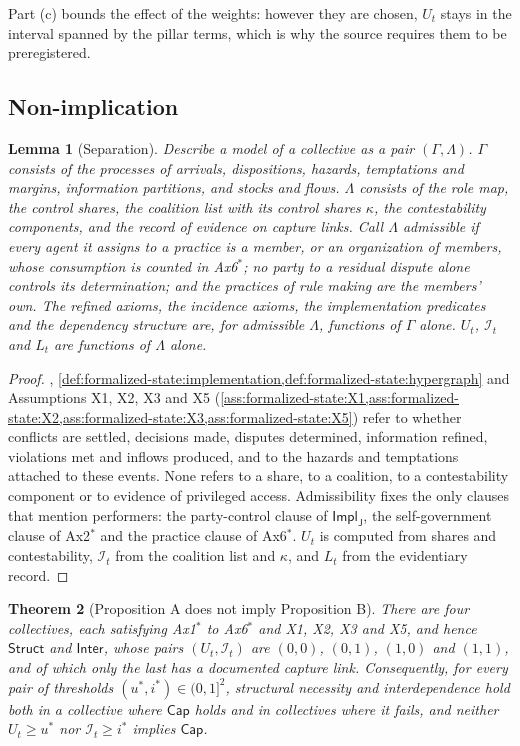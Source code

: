 \documentclass[11pt,letterpaper]{article}
\newtheorem{theorem}{Theorem}[section]
\newtheorem{lemma}[theorem]{Lemma}
\theoremstyle{definition}
\theoremstyle{remark}
\newcommand{\pJ}{\mathsf{J}}
\newcommand{\Integ}{\mathcal{I}}
\newcommand{\Struct}{\mathsf{Struct}}
\newcommand{\Inter}{\mathsf{Inter}}
\newcommand{\Capt}{\mathsf{Cap}}
\newcommand{\Impl}{\mathsf{Impl}}
\begin{document}
Part (c) bounds the effect of the weights: however they are chosen, $U_t$ stays in the interval spanned by the pillar terms, which is why the source requires them to be preregistered.

\subsection{Non-implication}

\begin{lemma}[Separation]
\label{lem:formalized-state:separation}
Describe a model of a collective as a pair $(\Gamma,\Lambda)$. $\Gamma$ consists of the processes of arrivals, dispositions, hazards, temptations and margins, information partitions, and stocks and flows. $\Lambda$ consists of the role map, the control shares, the coalition list with its control shares $\kappa$, the contestability components, and the record of evidence on capture links. Call $\Lambda$ admissible if every agent it assigns to a practice is a member, or an organization of members, whose consumption is counted in Ax6$^{*}$; no party to a residual dispute alone controls its determination; and the practices of rule making are the members' own. The refined axioms, the incidence axioms, the implementation predicates and the dependency structure are, for admissible $\Lambda$, functions of $\Gamma$ alone. $U_t$, $\Integ_t$ and $L_t$ are functions of $\Lambda$ alone.
\end{lemma}

\begin{proof}
, \cref{def:formalized-state:implementation,def:formalized-state:hypergraph} and Assumptions X1, X2, X3 and X5 (\cref{ass:formalized-state:X1,ass:formalized-state:X2,ass:formalized-state:X3,ass:formalized-state:X5}) refer to whether conflicts are settled, decisions made, disputes determined, information refined, violations met and inflows produced, and to the hazards and temptations attached to these events. None refers to a share, to a coalition, to a contestability component or to evidence of privileged access. Admissibility fixes the only clauses that mention performers: the party-control clause of $\Impl_{\pJ}$, the self-government clause of Ax2$^{*}$ and the practice clause of Ax6$^{*}$. $U_t$ is computed from shares and contestability, $\Integ_t$ from the coalition list and $\kappa$, and $L_t$ from the evidentiary record.
\end{proof}

\begin{theorem}[Proposition A does not imply Proposition B]
\label{thm:formalized-state:nonimplication}
There are four collectives, each satisfying Ax1$^{*}$ to Ax6$^{*}$ and X1, X2, X3 and X5, and hence $\Struct$ and $\Inter$, whose pairs $(U_t,\Integ_t)$ are $(0,0)$, $(0,1)$, $(1,0)$ and $(1,1)$, and of which only the last has a documented capture link. Consequently, for every pair of thresholds $(u^{*},i^{*})\in(0,1]^2$, structural necessity and interdependence hold both in a collective where $\Capt$ holds and in collectives where it fails, and neither $U_t\ge u^{*}$ nor $\Integ_t\ge i^{*}$ implies $\Capt$.
\end{theorem}
\end{document}
